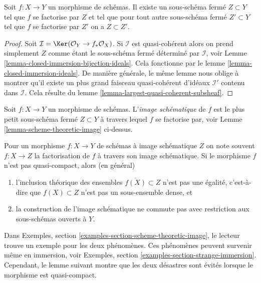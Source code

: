 \begin{lemma}
\label{lemma-scheme-theoretic-image}
Soit $f : X \to Y$ un morphisme de schémas. Il existe un sous-schéma fermé
$Z \subset Y$ tel que $f$ se factorise par $Z$ et tel que
pour tout autre sous-schéma fermé $Z' \subset Y$ tel que $f$
se factorise par $Z'$ on a $Z \subset Z'$.
\end{lemma}

\begin{proof}
Soit $\mathcal{I} = \Ker(\mathcal{O}_Y \to f_*\mathcal{O}_X)$. Si $\mathcal{I}$ est quasi-cohérent
alors on prend simplement $Z$ comme étant le
sous-schéma fermé déterminé par $\mathcal{I}$,
voir Lemme \ref{lemma-closed-immersion-bijection-ideals}. Cela fonctionne par le lemme
\ref{lemma-closed-immersion-ideals}. De manière générale,
le même lemme nous oblige à montrer qu'il existe
un plus grand faisceau quasi-cohérent d'idéaux $\mathcal{I}'$
contenu
dans $\mathcal{I}$. Cela résulte du lemme \ref{lemma-largest-quasi-coherent-subsheaf}.
\end{proof}

\begin{definition}
\label{definition-scheme-theoretic-image}
Soit $f : X \to Y$ un morphisme de schémas. L'{\it image schématique}
de $f$ est le plus petit sous-schéma fermé $Z \subset Y$ à travers lequel
$f$ se factorise par, voir Lemme \ref{lemma-scheme-theoretic-image} ci-dessus.
\end{definition}

\noindent
Pour un morphisme $f : X \to Y$ de schémas à image schématique $Z$ on note
souvent $f : X \to Z$ la factorisation de $f$ à travers
son image schématique. Si le morphisme $f$ n'est pas
quasi-compact, alors (en général)
\begin{enumerate}
\item l'inclusion théorique des ensembles $\overline{f(X)} \subset Z$ n'est pas une
égalité, c'est-à-dire que $f(X) \subset Z$ n'est pas un sous-ensemble dense, et
\item la construction de l'image schématique ne commute pas avec restriction
aux sous-schémas ouverts à $Y$.
\end{enumerate}
Dans Exemples, section \ref{examples-section-scheme-theoretic-image}, le lecteur trouve un exemple
pour les deux phénomènes. Ces phénomènes
peuvent survenir même en immersion, voir Exemples,
section \ref{examples-section-strange-immersion}. Cependant, le lemme suivant
montre que les deux désastres sont évités lorsque le
morphisme est quasi-compact.

